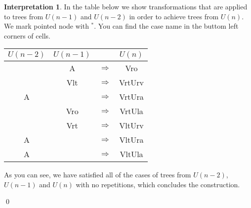 \documentclass[final]{article}
\theoremstyle{definition}
\theoremstyle{definition}
\newtheorem{interpretation}{Interpretation}[subsection]
\theoremstyle{remark}
\newcommand{\pointed}[1]{\ensuremath{{#1}^*}}
\begin{document}
\begin{interpretation}
In the table below we show transformations that are applied to trees from \(U(n-1)\) and \(U(n-2)\) in order to achieve trees from \(U(n)\). We mark pointed node with \(\pointed{}\). You can find the case name in the buttom left corners of cells.

\begin{center}
    \begin{longtable}{| c | c | c | c |}
        \hline

        \(U(n-2)\) &
        \(U(n-1)\) &
               &
        \(U(n)\)\\
        \hline

        &
        A  &
        \(\Rightarrow\)&
        Vro  \\
        \hline

        &
        Vlt  &
        \(\Rightarrow\)&
        VrtUrv  \\
        \hline

        A  &
        &
        \(\Rightarrow\)&
        VrtUra  \\
        \hline

        &
        Vro  &
        \(\Rightarrow\)&
        VrtUla  \\
        \hline

        &
        Vrt  &
        \(\Rightarrow\)&
        VltUrv  \\
        \hline

        A  &
        &
        \(\Rightarrow\)&
        VltUra  \\
        \hline

        A  &
        &
        \(\Rightarrow\)&
        VltUla  \\
        \hline
    \end{longtable}
\end{center}


As you can see, we have satisfied all of the cases of trees from \(U(n-2)\), \(U(n-1)\) and \(U(n)\) with no repetitions, which concludes the construction.

\qed
\end{interpretation}
\end{document}
